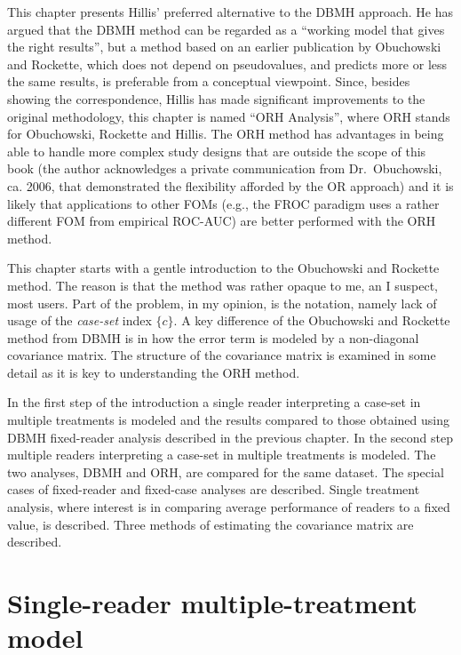 \documentclass[
]{book}
\begin{document}
This chapter presents Hillis' preferred alternative to the DBMH approach. He has argued that the DBMH method can be regarded as a ``working model that gives the right results'', but a method based on an earlier publication \citep{RN1450} by Obuchowski and Rockette, which does not depend on pseudovalues, and predicts more or less the same results, is preferable from a conceptual viewpoint. Since, besides showing the correspondence, Hillis has made significant improvements to the original methodology, this chapter is named ``ORH Analysis'', where ORH stands for Obuchowski, Rockette and Hillis. The ORH method has advantages in being able to handle more complex study designs \citep{RN2508} that are outside the scope of this book (the author acknowledges a private communication from Dr.~Obuchowski, ca. 2006, that demonstrated the flexibility afforded by the OR approach) and it is likely that applications to other FOMs (e.g., the FROC paradigm uses a rather different FOM from empirical ROC-AUC) are better performed with the ORH method.

This chapter starts with a gentle introduction to the Obuchowski and Rockette method. The reason is that the method was rather opaque to me, an I suspect, most users. Part of the problem, in my opinion, is the notation, namely lack of usage of the \emph{case-set} index \(\{c\}\). A key difference of the Obuchowski and Rockette method from DBMH is in how the error term is modeled by a non-diagonal covariance matrix. The structure of the covariance matrix is examined in some detail as it is key to understanding the ORH method.

In the first step of the introduction a single reader interpreting a case-set in multiple treatments is modeled and the results compared to those obtained using DBMH fixed-reader analysis described in the previous chapter. In the second step multiple readers interpreting a case-set in multiple treatments is modeled. The two analyses, DBMH and ORH, are compared for the same dataset. The special cases of fixed-reader and fixed-case analyses are described. Single treatment analysis, where interest is in comparing average performance of readers to a fixed value, is described. Three methods of estimating the covariance matrix are described.

\hypertarget{OR1RMTModel}{%
\section{Single-reader multiple-treatment model}\label{OR1RMTModel}}
\end{document}
